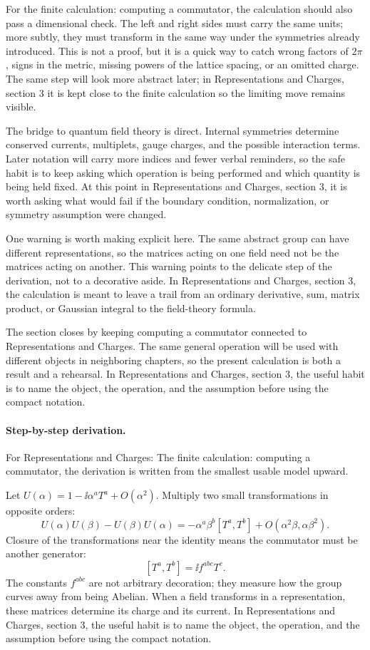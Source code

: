 For the finite calculation: computing a commutator, the calculation should also pass a dimensional check.  The left and right sides must carry the same units; more subtly, they must transform in the same way under the symmetries already introduced.  This is not a proof, but it is a quick way to catch wrong factors of \(2\pi\), signs in the metric, missing powers of the lattice spacing, or an omitted charge.  The same step will look more abstract later; in Representations and Charges, section 3 it is kept close to the finite calculation so the limiting move remains visible.

The bridge to quantum field theory is direct.  Internal symmetries determine conserved currents, multiplets, gauge charges, and the possible interaction terms.  Later notation will carry more indices and fewer verbal reminders, so the safe habit is to keep asking which operation is being performed and which quantity is being held fixed.  At this point in Representations and Charges, section 3, it is worth asking what would fail if the boundary condition, normalization, or symmetry assumption were changed.

One warning is worth making explicit here.  The same abstract group can have different representations, so the matrices acting on one field need not be the matrices acting on another.  This warning points to the delicate step of the derivation, not to a decorative aside.  In Representations and Charges, section 3, the calculation is meant to leave a trail from an ordinary derivative, sum, matrix product, or Gaussian integral to the field-theory formula.

The section closes by keeping computing a commutator connected to Representations and Charges.  The same general operation will be used with different objects in neighboring chapters, so the present calculation is both a result and a rehearsal.  In Representations and Charges, section 3, the useful habit is to name the object, the operation, and the assumption before using the compact notation.



\paragraph{Step-by-step derivation.}

For Representations and Charges: The finite calculation: computing a commutator, the derivation is written from the smallest usable model upward.

Let \(U(\alpha)=1-\ii\alpha^aT^a+O(\alpha^2)\).  Multiply two small transformations in opposite orders:
\[
  U(\alpha)U(\beta)-U(\beta)U(\alpha)
  =
  -\alpha^a\beta^b[T^a,T^b]+O(\alpha^2\beta,\alpha\beta^2).
\]
Closure of the transformations near the identity means the commutator must be another generator:
\[
  [T^a,T^b]=\ii f^{abc}T^c.
\]
The constants \(f^{abc}\) are not arbitrary decoration; they measure how the group curves away from being Abelian.  When a field transforms in a representation, these matrices determine its charge and its current.  In Representations and Charges, section 3, the useful habit is to name the object, the operation, and the assumption before using the compact notation.

